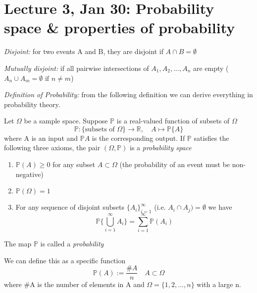 \documentclass[12pt]{article}
\renewcommand{\P}{\mathbb{P}}
\begin{document}
\section{Lecture 3, Jan 30: Probability space \& properties of probability}
\emph{Disjoint:} for two events A and B, they are disjoint if $A \cap B = \emptyset$

\emph{Mutually disjoint:} if all pairwise intersections of $A_1, A_2, ..., A_n$ are empty ($A_n \cup A_m = \emptyset \text{ if } n \neq m$)

\emph{Definition of Probability:} from the following definition we can derive everything in probability theory.

Let $\Omega$ be a sample space. Suppose $\mathbb{P}$ is a real-valued function of subsets of $\Omega$
\[\mathbb{P} : \{\text{subsets of } \Omega\} \to \mathbb{R}, \quad A \mapsto \mathbb{P}\{A\}\]
where A is an input and $\P{A}$ is the corresponding output. If $\P$ satisfies the following three axioms, the pair $(\Omega, \P)$ is a \emph{probability space}
\begin{enumerate}
    \item $\P(A) \geq 0$ for any subset $A \subset \Omega$ (the probability of an event must be non-negative)
    \item $\P(\Omega) = 1$
    \item For any sequence of disjoint subsets $\{A_i\}_{i = 1}^\infty$ (i.e. $A_i \cap A_j) = \emptyset$ we have 
    \[\P\{\bigcup_{i=1}^\infty A_i\} = \sum_{i =1}^\infty \P(A_i)\]
\end{enumerate}

The map $\P$ is called a \emph{probability}

We can define this as a specific function
\[\P(A) := \frac{\#A}{n} \quad A \subset \Omega\]
where \#A is the number of elements in A and $\Omega = \{1, 2, ..., n\}$ with a large n. 
\end{document}
